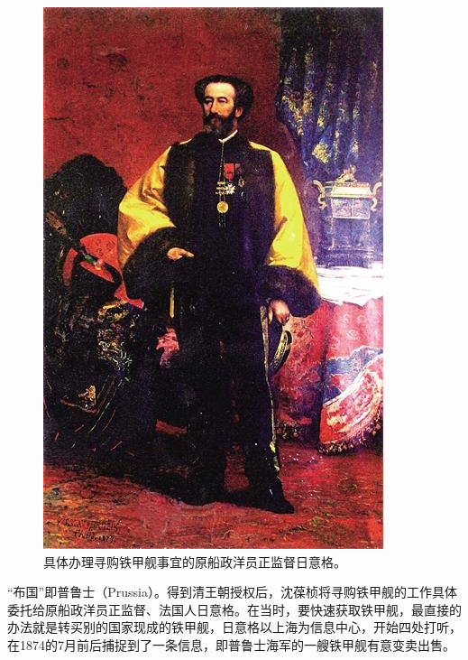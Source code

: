 \documentclass[12pt,UTF8]{ctexbook}
\begin{document}
\begin{figure}[htbp]
	\centering
	\includegraphics[width=1\linewidth]{Images/43}
	\caption{具体办理寻购铁甲舰事宜的原船政洋员正监督日意格。}
	\label{fig:1}
\end{figure}

“布国”即普鲁士（Prussia）。得到清王朝授权后，沈葆桢将寻购铁甲舰的工作具体委托给原船政洋员正监督、法国人日意格。在当时，要快速获取铁甲舰，最直接的办法就是转买别的国家现成的铁甲舰，日意格以上海为信息中心，开始四处打听，在1874的7月前后捕捉到了一条信息，即普鲁士海军的一艘铁甲舰有意变卖出售。
\end{document}
